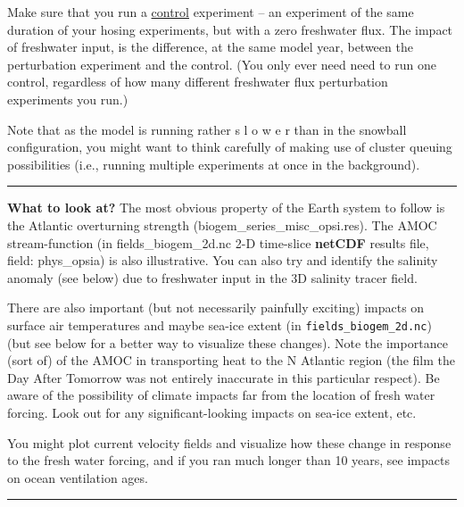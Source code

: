 Make sure that you run a \uline{control} experiment -- an experiment of the same duration of your hosing experiments, but with a zero freshwater flux. The impact of freshwater input, is the difference, at the same model year, between the perturbation experiment and the control. (You only ever need need to run one control, regardless of how many different freshwater flux perturbation experiments  you run.) 

Note that as the model is running rather s l o w e r than in the snowball configuration, you might want to think carefully of making use of cluster queuing possibilities (i.e., running multiple experiments at once in the background).

\vspace{1mm}\noindent\rule{4cm}{0.5pt}\vspace{2mm}

\noindent \textbf{What to look at?} The most obvious property of the Earth system to follow is the Atlantic overturning strength (\textsf{\footnotesize biogem\_series\_misc\_opsi.res}). The AMOC stream-function (in \textsf{\footnotesize fields\_biogem\_2d.nc} 2-D time-slice \textbf{netCDF} results file, field: \textsf{\footnotesize phys\_opsia}) is also illustrative. You can also try and identify the salinity anomaly (see below) due to freshwater input in the 3D salinity tracer field.

There are also important (but not necessarily painfully exciting) impacts on surface air temperatures and maybe sea-ice extent (in \texttt{fields\_biogem\_2d.nc}) (but see below for a better way to visualize these changes). Note the importance (sort of) of the AMOC in transporting heat to the N Atlantic region (the film the Day After Tomorrow was not entirely inaccurate in this particular respect). Be aware of the possibility of climate impacts far from the location of fresh water forcing. Look out for any significant-looking impacts on sea-ice extent, etc.

You might plot current velocity fields and visualize how these change in response to the fresh water forcing, and if you ran much longer than 10 years, see impacts on ocean ventilation ages.

\vspace{1mm}\noindent\rule{4cm}{0.5pt}\vspace{2mm}

